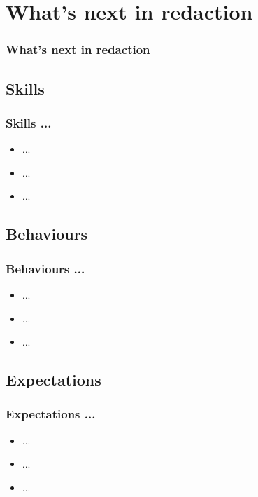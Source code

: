 \documentclass[slidetop,11pt]{beamer}
\begin{document}
\def\sectionIIItitle{What's next in redaction}
\section{ \sectionIIItitle }
\begin{frame}
	\frametitle{ \sectionIIItitle }
	\tableofcontents[sections=3,currentsection,subsectionstyle=show/shaded/hide]
\end{frame} 

\subsection{ Skills }
\begin{frame}
	\frametitle{ Skills ... }
	\begin{itemize}
		\item ... 
		\item ... 
		\item ... 
	\end{itemize}
\end{frame}

\subsection{ Behaviours }
\begin{frame}
	\frametitle{ Behaviours ... }
	\begin{itemize}
		\item ... 
		\item ... 
		\item ... 
	\end{itemize}
\end{frame}

\subsection{ Expectations }
\begin{frame}
	\frametitle{ Expectations ... }
	\begin{itemize}
		\item ... 
		\item ... 
		\item ... 
	\end{itemize}
\end{frame}
\end{document}
